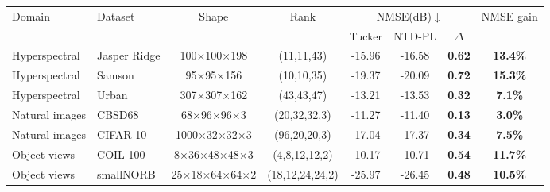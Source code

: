 \begin{tabular}{@{}l l c c c c c c@{}}
\toprule
\multirow{2}{*}{Domain} & \multirow{2}{*}{Dataset} & \multirow{2}{*}{Shape} & \multirow{2}{*}{Rank} & \multicolumn{3}{c}{NMSE(dB)$\downarrow$} & \multirow{2}{*}{NMSE gain} \\
\cmidrule(lr){5-7}
& & & & Tucker & NTD-PL & $\Delta$ & \\
\midrule
Hyperspectral & Jasper Ridge & 100$\times$100$\times$198 & (11,11,43) & -15.96 & -16.58 & \textbf{0.62} & \textbf{13.4\%} \\
Hyperspectral & Samson & 95$\times$95$\times$156 & (10,10,35) & -19.37 & -20.09 & \textbf{0.72} & \textbf{15.3\%} \\
Hyperspectral & Urban & 307$\times$307$\times$162 & (43,43,47) & -13.21 & -13.53 & \textbf{0.32} & \textbf{7.1\%} \\
\midrule
Natural images & CBSD68 & 68$\times$96$\times$96$\times$3 & (20,32,32,3) & -11.27 & -11.40 & \textbf{0.13} & \textbf{3.0\%} \\
Natural images & CIFAR-10 & 1000$\times$32$\times$32$\times$3 & (96,20,20,3) & -17.04 & -17.37 & \textbf{0.34} & \textbf{7.5\%} \\
\midrule
Object views & COIL-100 & 8$\times$36$\times$48$\times$48$\times$3 & (4,8,12,12,2) & -10.17 & -10.71 & \textbf{0.54} & \textbf{11.7\%} \\
Object views & smallNORB & 25$\times$18$\times$64$\times$64$\times$2 & (18,12,24,24,2) & -25.97 & -26.45 & \textbf{0.48} & \textbf{10.5\%} \\
\bottomrule
\end{tabular}
